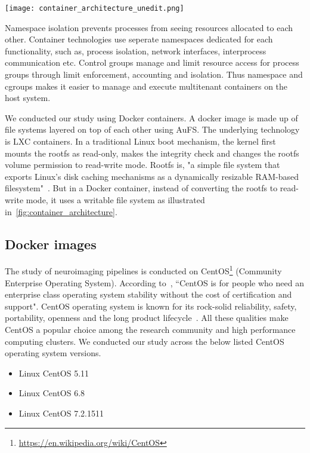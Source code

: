 \begin{center}
   \texttt{[image: container\_architecture\_unedit.png]}
   \label{fig:container_architecture}
\end{center}

Namespace isolation prevents processes from seeing resources allocated to each other. Container technologies use seperate namespaces dedicated for each functionality, such as, process isolation, network interfaces, interprocess communication etc. Control groups manage and limit resource access for process groups through limit enforcement, accounting and isolation. Thus namespace and cgroups makes it easier to manage and execute multitenant containers on the host system.

We conducted our study using Docker containers. A docker image is made up of file systems layered on top of each other using AuFS. The underlying technology is LXC containers. In a traditional Linux boot mechanism, the kernel first mounts the rootfs as read-only, makes the integrity check and changes the rootfs volume permission to read-write mode. Rootfs is, "a simple file system that exports Linux's disk caching mechanisms as a dynamically resizable RAM-based filesystem"~\cite{Rootfs}. But in a Docker container, instead of converting the rootfs to read-write mode, it uses a writable file system as illustrated in~\ref{fig:container_architecture}. 

\subsection{Docker images}
The study of neuroimaging pipelines is conducted on CentOS\footnote{\url{https://en.wikipedia.org/wiki/CentOS}} (Community Enterprise Operating System). According to~\cite{CentOS}, ``CentOS is for people who need an enterprise class operating system stability without the cost of certification and support". CentOS operating system is known for its rock-solid reliability, safety, portability, openness and the long product lifecycle~\cite{5665431}. All these qualities make CentOS a popular choice among the research community and
high performance computing clusters. We conducted our study across the below listed CentOS operating system versions.

\begin{itemize}
  \item Linux CentOS 5.11
  \item Linux CentOS 6.8
  \item Linux CentOS 7.2.1511
\end{itemize}

